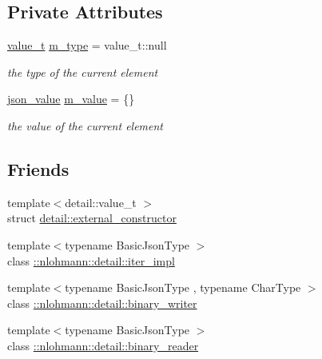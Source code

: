 \subsection*{Private Attributes}
\begin{DoxyCompactItemize}
\item 
\hyperlink{namespacenlohmann_1_1detail_a1ed8fc6239da25abcaf681d30ace4985}{value\+\_\+t} \hyperlink{classnlohmann_1_1basic__json_a91990b60d7d4d67968a2c1db677536e7}{m\+\_\+type} = value\+\_\+t\+::null
\begin{DoxyCompactList}\small\item\em the type of the current element \end{DoxyCompactList}\item 
\hyperlink{unionnlohmann_1_1basic__json_1_1json__value}{json\+\_\+value} \hyperlink{classnlohmann_1_1basic__json_aeb0814f76966f99290cb29e127c90a77}{m\+\_\+value} = \{\}
\begin{DoxyCompactList}\small\item\em the value of the current element \end{DoxyCompactList}\end{DoxyCompactItemize}
\subsection*{Friends}
\begin{DoxyCompactItemize}
\item 
{\footnotesize template$<$detail\+::value\+\_\+t $>$ }\\struct \hyperlink{classnlohmann_1_1basic__json_a6275ed57bae6866cdf5db5370a7ad47c}{detail\+::external\+\_\+constructor}
\item 
{\footnotesize template$<$typename Basic\+Json\+Type $>$ }\\class \hyperlink{classnlohmann_1_1basic__json_a842e5c7ca096025c18b11e715d3401f4}{\+::nlohmann\+::detail\+::iter\+\_\+impl}
\item 
{\footnotesize template$<$typename Basic\+Json\+Type , typename Char\+Type $>$ }\\class \hyperlink{classnlohmann_1_1basic__json_a69d491bbda88ade6d3c7a2b11309e8bf}{\+::nlohmann\+::detail\+::binary\+\_\+writer}
\item 
{\footnotesize template$<$typename Basic\+Json\+Type $>$ }\\class \hyperlink{classnlohmann_1_1basic__json_af0bb1c07bf0d88f8b86a235c92893a39}{\+::nlohmann\+::detail\+::binary\+\_\+reader}
\end{DoxyCompactItemize}
